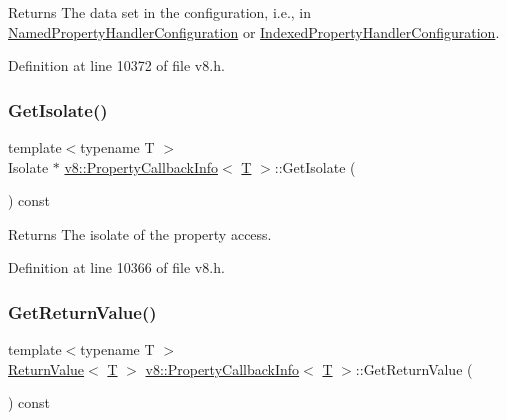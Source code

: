 \begin{DoxyReturn}{Returns}
The data set in the configuration, i.\+e., in {\ttfamily \mbox{\hyperlink{structv8_1_1NamedPropertyHandlerConfiguration}{Named\+Property\+Handler\+Configuration}}} or {\ttfamily \mbox{\hyperlink{structv8_1_1IndexedPropertyHandlerConfiguration}{Indexed\+Property\+Handler\+Configuration}}.} 
\end{DoxyReturn}


Definition at line 10372 of file v8.\+h.

\mbox{\label{classv8_1_1PropertyCallbackInfo_aff7b838ede308ab8a42890962eb9271c}} 
\subsubsection{\texorpdfstring{Get\+Isolate()}{GetIsolate()}}
{\footnotesize\ttfamily template$<$typename T $>$ \\
Isolate $\ast$ \mbox{\hyperlink{classv8_1_1PropertyCallbackInfo}{v8\+::\+Property\+Callback\+Info}}$<$ \mbox{\hyperlink{classv8_1_1internal_1_1torque_1_1T}{T}} $>$\+::Get\+Isolate (\begin{DoxyParamCaption}{ }\end{DoxyParamCaption}) const}

\begin{DoxyReturn}{Returns}
The isolate of the property access. 
\end{DoxyReturn}


Definition at line 10366 of file v8.\+h.

\mbox{\label{classv8_1_1PropertyCallbackInfo_aa0882946929c3c4df6d131fe0d8d6746}} 
\subsubsection{\texorpdfstring{Get\+Return\+Value()}{GetReturnValue()}}
{\footnotesize\ttfamily template$<$typename T $>$ \\
\mbox{\hyperlink{classv8_1_1ReturnValue}{Return\+Value}}$<$ \mbox{\hyperlink{classv8_1_1internal_1_1torque_1_1T}{T}} $>$ \mbox{\hyperlink{classv8_1_1PropertyCallbackInfo}{v8\+::\+Property\+Callback\+Info}}$<$ \mbox{\hyperlink{classv8_1_1internal_1_1torque_1_1T}{T}} $>$\+::Get\+Return\+Value (\begin{DoxyParamCaption}{ }\end{DoxyParamCaption}) const}

